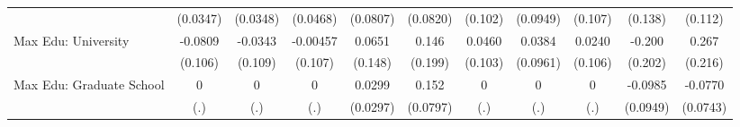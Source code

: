 {\begin{tabular}{l*{10}{c}}
            &    (0.0347)         &    (0.0348)         &    (0.0468)         &    (0.0807)         &    (0.0820)         &     (0.102)         &    (0.0949)         &     (0.107)         &     (0.138)         &     (0.112)         \\
\addlinespace
Max Edu: University&     -0.0809         &     -0.0343         &    -0.00457         &      0.0651         &       0.146         &      0.0460         &      0.0384         &      0.0240         &      -0.200         &       0.267         \\
            &     (0.106)         &     (0.109)         &     (0.107)         &     (0.148)         &     (0.199)         &     (0.103)         &    (0.0961)         &     (0.106)         &     (0.202)         &     (0.216)         \\
\addlinespace
Max Edu: Graduate School&           0         &           0         &           0         &      0.0299         &       0.152         &           0         &           0         &           0         &     -0.0985         &     -0.0770         \\
            &         (.)         &         (.)         &         (.)         &    (0.0297)         &    (0.0797)         &         (.)         &         (.)         &         (.)         &    (0.0949)         &    (0.0743)         \\
\bottomrule
\end{tabular}
}
